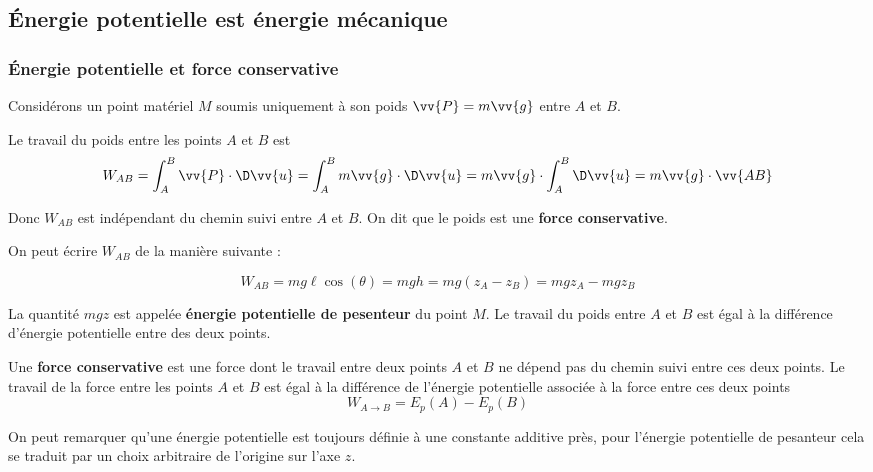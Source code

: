 \documentclass{cours}
\begin{document}
\subsection{Énergie potentielle est énergie mécanique}%
\label{sub:energie_potentielle_est_energie_mecanique}

\subsubsection{Énergie potentielle et force conservative}%
\label{ssub:energie_potentielle_est_force_conservative}

Considérons un point matériel $M$ soumis uniquement à son poids $\vv{P} = m\vv{g}$ entre $A$ et $B$. 

Le travail du poids entre les points $A$ et $B$ est 
\begin{equation}
W_{AB} = \int_A^B\vv{P}\cdot\D \vv{u} = \int_A^B m\vv{g}\cdot\D \vv{u} = m\vv{g}\cdot\int_A^B\D\vv{u} = m\vv{g}\cdot\vv{AB}
\end{equation}

Donc $W_{AB}$ est indépendant du chemin suivi entre $A$ et $B$. On dit que le poids est une \textbf{force conservative}.

On peut écrire $W_{AB}$ de la manière suivante :
\begin{center}
\end{center}

\begin{equation}
W_{AB} = mg\ell\cos(\theta) = mgh = mg(z_A - z_B) = mgz_A - mgz_B 
\end{equation}

La quantité $mgz$ est appelée \textbf{énergie potentielle de pesenteur} du point $M$. Le travail du poids entre $A$ et $B$ est égal à la différence d'énergie potentielle entre des deux points. 

\begin{definition}
  Une \textbf{force conservative} est une force dont le travail entre deux points $A$ et $B$  ne dépend pas du chemin suivi entre ces deux points. Le travail de la force entre les points $A$  et $B$ est égal à la différence de l'énergie potentielle associée à la force entre ces deux points
  \begin{equation}
  W_{A\rightarrow B} = E_p(A) - E_p(B)
  \end{equation}
\end{definition}
On peut remarquer qu'une énergie potentielle est toujours définie à une constante additive près, pour l'énergie potentielle de pesanteur cela se traduit par un choix arbitraire de l'origine sur l'axe $z$. 
\end{document}
